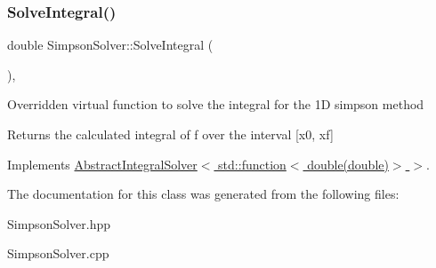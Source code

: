 \subsubsection{\texorpdfstring{Solve\+Integral()}{SolveIntegral()}}
{\footnotesize\ttfamily double Simpson\+Solver\+::\+Solve\+Integral (\begin{DoxyParamCaption}{ }\end{DoxyParamCaption})\hspace{0.3cm}{\ttfamily [override]}, {\ttfamily [virtual]}}

Overridden virtual function to solve the integral for the 1D simpson method \begin{DoxyReturn}{Returns}
the calculated integral of f over the interval \mbox{[}x0, xf\mbox{]} 
\end{DoxyReturn}


Implements \hyperlink{class_abstract_integral_solver_ad87cb44c5ef3122bc95be48f473ba399}{Abstract\+Integral\+Solver$<$ std\+::function$<$ double(double)$>$ $>$}.



The documentation for this class was generated from the following files\+:\begin{DoxyCompactItemize}
\item 
Simpson\+Solver.\+hpp\item 
Simpson\+Solver.\+cpp\end{DoxyCompactItemize}
